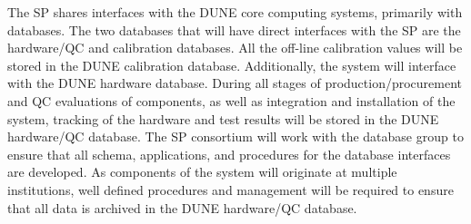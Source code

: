 The SP  shares interfaces with the DUNE core computing systems, primarily with databases. The two databases that will have direct interfaces with the SP  are the hardware/QC and calibration databases. All the off-line calibration values will be stored in the DUNE calibration database. Additionally, the system will interface with the DUNE hardware database. During all stages of production/procurement and QC evaluations of  components, as well as integration and installation of the system, tracking of the hardware and test results will be stored in the DUNE hardware/QC database. The SP  consortium will work with the database group to ensure that all schema, applications, and procedures for the database interfaces are developed. As components of the system will originate at multiple institutions, well defined procedures and management will be required to ensure that all data is archived in the DUNE hardware/QC database. 


